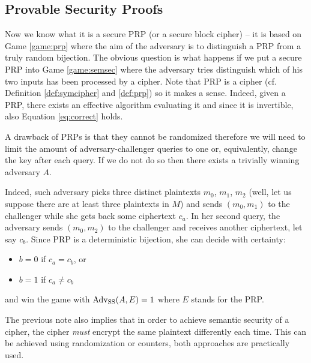 
\subsection{Provable Security Proofs}

Now we know what it is a secure PRP (or a secure block cipher) -- it is based on Game \ref{game:prp} where the aim of the adversary is to distinguish a PRP from a truly random bijection. The obvious question is what happens if we put a secure PRP into Game \ref{game:semsec} where the adversary tries distinguish which of his two inputs has been processed by a cipher. Note that PRP is a cipher (cf. Definition \ref{def:symcipher} and \ref{def:prp}) so it makes a sense. Indeed, given a PRP, there exists an effective algorithm evaluating it and since it is invertible, also Equation \ref{eq:correct} holds.

\begin{note}
\label{note:singleaccess}
	A drawback of PRPs is that they cannot be randomized therefore we will need to limit the amount of adversary-challenger queries to one or, equivalently, change the key after each query. If we do not do so then there exists a trivially winning adversary $A$.
	
	Indeed, such adversary picks three distinct plaintexts $m_0$, $m_1$, $m_2$ (well, let us suppose there are at least three plaintexts in $M$) and sends $(m_0,m_1)$ to the challenger while she gets back some ciphertext $c_a$. In her second query, the adversary sends $(m_0,m_2)$ to the challenger and receives another ciphertext, let say $c_b$. Since PRP is a deterministic bijection, she can decide with certainty:
	\begin{itemize}
		\item $b=0$ if $c_a = c_b$, or
		\item $b=1$ if $c_a \neq c_b$
	\end{itemize}
	and win the game with $\operatorname*{Adv_{SS}}(A,E) = 1$ where $E$ stands for the PRP.
\end{note}

\begin{note}
\label{note:randomize}
	The previous note also implies that in order to achieve semantic security of a cipher, the cipher {\em must} encrypt the same plaintext differently each time. This can be achieved using randomization or counters, both approaches are practically used.
\end{note}

